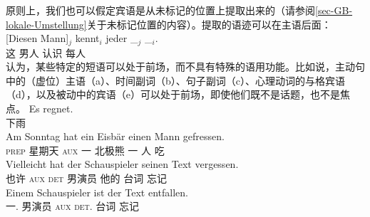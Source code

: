 原则上，我们也可以假定宾语是从未标记的位置上提取出来的（请参阅\ref{sec-GB-lokale-Umstellung}关于未标记位置的内容）。提取的语迹可以在主语后面：
\ea
\label{Beispiel-Diesen-Mann-kent-jeder-trace-follows-subjectHPSG}
\gll {}[Diesen Mann]$_j$ kennt$_i$ jeder \_$_j$  \_$_i$.\\
	 {}\spacebr{}这 男人 认识 每人 {}\\
\z
 \citet{Fanselow2004c}认为，某些特定的短语可以处于前场，而不具有特殊的语用功能。比如说，主动句中的（虚位）主语（a）、时间副词（b）、句子副词（c）、心理动词的与格宾语（d），以及被动中的宾语（e）可以处于前场，即使他们既不是话题，也不是焦点。
\eal
\ex
\gll Es regnet.\\
     \expl{} 下雨\\
\ex 
\gll Am Sonntag hat ein Eisbär einen Mann gefressen.\\
     \textsc{prep} 星期天 \textsc{aux} 一 北极熊 一 人 吃\\
\ex 
\gll Vielleicht hat der Schauspieler seinen Text vergessen.\\
     也许    \textsc{aux} \textsc{det} 男演员 他的 台词 忘记\\
\ex 
\gll Einem Schauspieler ist der Text entfallen.\\
     一.\dat{} 男演员 \textsc{aux} \textsc{det}.\nom{} 台词 忘记\\
